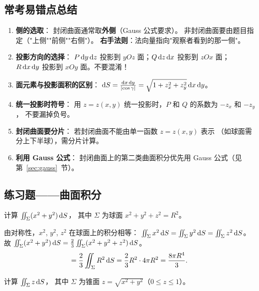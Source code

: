 \documentclass{article}
\begin{document}
\subsection{常考易错点总结}

\begin{enumerate}
  \item \textbf{侧的选取}：
    封闭曲面通常取\textbf{外侧}（Gauss 公式要求）。
    非封闭曲面要由题目指定（"上侧""前侧""右侧"）。
    \textbf{右手法则}：法向量指向"观察者看到的那一侧"。
  \item \textbf{投影方向的选择}：
    $P\,\mathrm{d} y\,\mathrm{d} z$ 投影到 $yOz$ 面；$Q\,\mathrm{d} z\,\mathrm{d} x$ 投影到 $zOx$ 面；
    $R\,\mathrm{d} x\,\mathrm{d} y$ 投影到 $xOy$ 面。不要混淆！
  \item \textbf{面元素与投影面积的区别}：
    $\mathrm{d} S = \frac{\mathrm{d} x\,\mathrm{d} y}{\left| \cos\gamma \right|} =
    \sqrt{1+z_x^2+z_y^2}\,\mathrm{d} x\,\mathrm{d} y$。
  \item \textbf{统一投影时符号}：
    用 $z = z(x,y)$ 统一投影时，$P$ 和 $Q$ 的系数为 $-z_x$ 和 $-z_y$，
    不要漏掉负号。
  \item \textbf{封闭曲面要分片}：
    若封闭曲面不能由单一函数 $z=z(x,y)$ 表示
    （如球面需分上下半球），需分片计算。
  \item \textbf{利用 Gauss 公式}：
    封闭曲面上的第二类曲面积分优先用 Gauss 公式（见第~\ref{sec:gauss}~节）。
\end{enumerate}

\subsection{练习题——曲面积分}

\begin{exercise}[第一类曲面积分——球面]
  计算 $\iint_\Sigma (x^2+y^2) \,\mathrm{d} S$，
  其中 $\Sigma$ 为球面 $x^2+y^2+z^2 = R^2$。
\end{exercise}

\begin{solution}
  由对称性，$x^2$, $y^2$, $z^2$ 在球面上的积分相等：
  $\iint_\Sigma x^2 \,\mathrm{d} S = \iint_\Sigma y^2 \,\mathrm{d} S =
  \iint_\Sigma z^2 \,\mathrm{d} S$。
  故 $\iint_\Sigma (x^2+y^2) \,\mathrm{d} S = \frac{2}{3} \iint_\Sigma
  (x^2+y^2+z^2) \,\mathrm{d} S$。
  \[
    = \frac{2}{3} \iint_\Sigma R^2 \,\mathrm{d} S
    = \frac{2}{3} R^2 \cdot 4\pi R^2
    = \frac{8\pi R^4}{3}.
  \]
\end{solution}

\begin{exercise}
  计算 $\iint_\Sigma z \,\mathrm{d} S$，
  其中 $\Sigma$ 为锥面 $z = \sqrt{x^2+y^2}$（$0 \le z \le 1$）。
\end{exercise}
\end{document}

